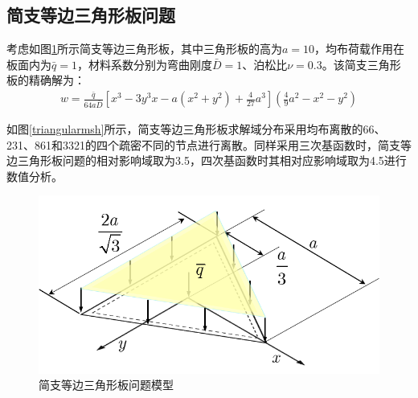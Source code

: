 \subsection{简支等边三角形板问题}
考虑如图\ref{triangular}所示简支等边三角形板，其中三角形板的高为$a=10$，均布荷载作用在板面内为$\bar{q}=1$，材料系数分别为弯曲刚度$\bar{D}=1$、泊松比$\nu=0.3$。该简支三角形板的精确解为：
\begin{equation}
\begin{split}
    w=\frac{\bar q}{64a\bar D}[x^3-3y^3x-a(x^2+y^2)+\frac{4}{27}a^3](\frac{4}{9}a^2-x^2-y^2)
\end{split}
\end{equation}\par
如图\ref{triangularmsh}所示，简支等边三角形板求解域分布采用均布离散的66、231、861和3321的四个疏密不同的节点进行离散。同样采用三次基函数时，简支等边三角形板问题的相对影响域取为3.5，四次基函数时其相对应影响域取为4.5进行数值分析。\par
\begin{figure}[H]
    \centering
    \includegraphics[scale=0.7]{figure/PHR/T/triangular.png}
    \caption{简支等边三角形板问题模型}\label{triangular}
\end{figure}

